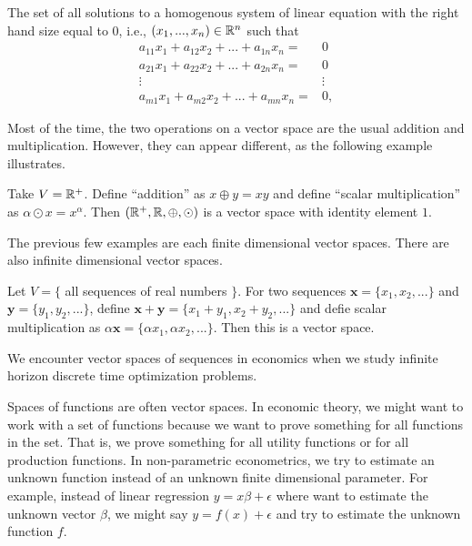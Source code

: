 \begin{example}
  The set of all solutions to a homogenous system of linear equation
  with the right hand size equal to $0$,
  i.e., $(x_1, ..., x_n) \in \mathbb{R}^n$ such that 
  \begin{align*}
    a_{11} x_1 + a_{12} x_2 + ... + a_{1n} x_n = & 0 \\
    a_{21} x_1 + a_{22} x_2 + ... + a_{2n} x_n = & 0 \\
    \vdots & \vdots \\
    a_{m1} x_1 + a_{m2} x_2 + ... + a_{mn} x_n = & 0 ,
  \end{align*}
\end{example}  
Most of the time, the two operations on a vector space are the usual
addition and multiplication. However, they can appear different, as
the following example illustrates.
\begin{example}
  Take $V = \mathbb{R}^+$. Define ``addition'' as $x \oplus y = xy$ and define
  ``scalar multiplication'' as $\alpha \odot x = x^\alpha$. Then
  $(\mathbb{R}^+,\mathbb{R}, \oplus, \odot)$ is a vector space with identity element
  $1$.   
\end{example}

The previous few examples are each finite dimensional vector
spaces. There are also infinite dimensional vector spaces.
\begin{example}
  Let $V = \{$ all sequences of real numbers $\}$. For two sequences
  $\mathbf{x} = \{x_1, x_2, ... \}$ and $\mathbf{y} = \{y_1, y_2,
  ... \}$, define $\mathbf{x} + \mathbf{y} = \{ x_1 + y_1 , x_2 + y_2,
  ... \}$ and defie scalar multiplication as $\alpha \mathbf{x} = \{
  \alpha x_1 , \alpha x_2, ... \}$. Then this is a vector space.
\end{example}
We encounter vector spaces of sequences in economics when we study
infinite horizon discrete time optimization problems. 

Spaces of functions are often vector spaces. In economic
theory, we might want to work with a set of functions because we want
to prove something for all functions in the set. That is, we prove
something for all utility functions or for all production
functions. In non-parametric econometrics, we try to estimate an
unknown function instead of an unknown finite dimensional
parameter. For example, instead of linear regression $y = x\beta +
\epsilon$ where want to estimate the unknown vector $\beta$, we might
say $y = f(x) + \epsilon$ and try to estimate the unknown function
$f$. 

